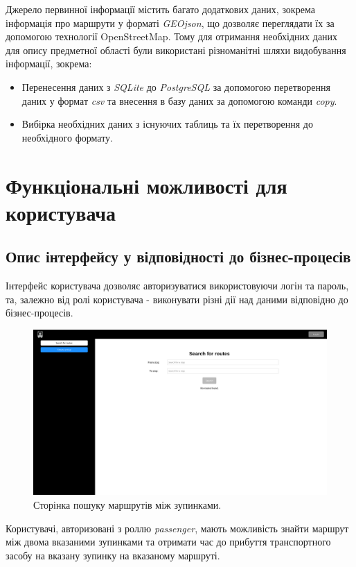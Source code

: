 \documentclass[oneside,14pt]{extarticle}
\begin{document}
Джерело первинної інформації містить багато додаткових даних, зокрема інформація про маршрути у форматі \textit{GEOjson}, що дозволяє переглядати їх за допомогою технології OpenStreetMap. Тому для отримання необхідних даних для опису предметної області були використані різноманітні шляхи видобування інформації, зокрема: 
\begin{itemize}
\item Перенесення даних з \textit{SQLite} до \textit{PostgreSQL} за допомогою перетворення даних у формат \textit{csv} та внесення в базу даних за допомогою команди \textit{copy}.
\item Вибірка необхідних даних з існуючих таблиць та їх перетворення до необхідного формату.
\end{itemize}

\newpage

\section{Функціональні можливості для користувача}
\subsection{Опис інтерфейсу у відповідності до бізнес-процесів}
Інтерфейс користувача дозволяє авторизуватися використовуючи логін та пароль, та, залежно від ролі користувача - виконувати різні дії над даними відповідно до бізнес-процесів.

\begin{figure}[H]
\centering
\includegraphics[scale=0.25]{1}
\caption{Сторінка пошуку маршрутів між зупинками.}
\end{figure}

Користувачі, авторизовані з роллю \textit{passenger}, мають можливість знайти маршрут між двома вказаними зупинками та отримати час до прибуття транспортного засобу на вказану зупинку на вказаному маршруті.
\end{document}
